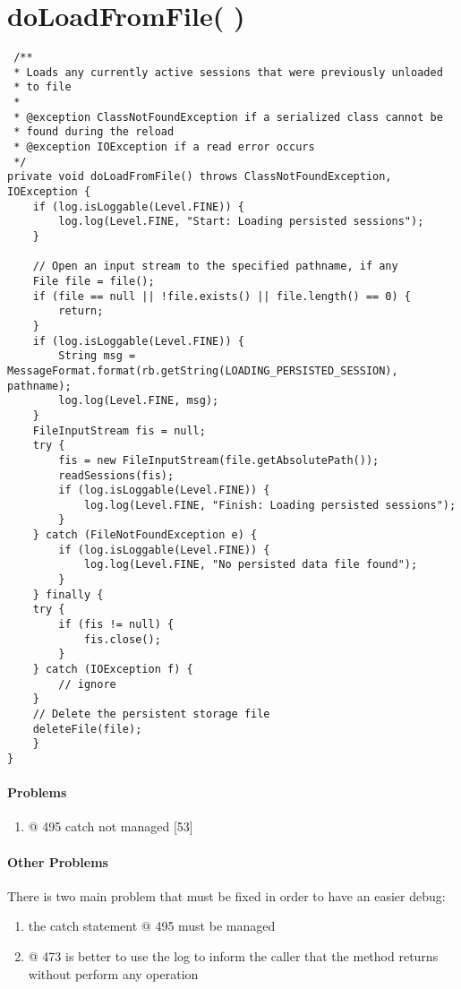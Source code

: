 
\section*{doLoadFromFile( )}

\lstset{firstnumber=457}
\begin{lstlisting}
 /**
 * Loads any currently active sessions that were previously unloaded
 * to file
 *
 * @exception ClassNotFoundException if a serialized class cannot be
 * found during the reload
 * @exception IOException if a read error occurs
 */
private void doLoadFromFile() throws ClassNotFoundException, IOException {
	if (log.isLoggable(Level.FINE)) {
		log.log(Level.FINE, "Start: Loading persisted sessions");
	}

	// Open an input stream to the specified pathname, if any
	File file = file();
	if (file == null || !file.exists() || file.length() == 0) {
		return;
	}
	if (log.isLoggable(Level.FINE)) {
		String msg = MessageFormat.format(rb.getString(LOADING_PERSISTED_SESSION), pathname);
		log.log(Level.FINE, msg);
	}
	FileInputStream fis = null;
	try {
		fis = new FileInputStream(file.getAbsolutePath());
		readSessions(fis);
		if (log.isLoggable(Level.FINE)) {
			log.log(Level.FINE, "Finish: Loading persisted sessions");
		}
	} catch (FileNotFoundException e) {
		if (log.isLoggable(Level.FINE)) {
			log.log(Level.FINE, "No persisted data file found");
		}
	} finally {
	try {
		if (fis != null) {
			fis.close();
		}
	} catch (IOException f) {
		// ignore
	}
	// Delete the persistent storage file
	deleteFile(file);
	}
}

\end{lstlisting}

\paragraph{Problems}
\begin{enumerate}
	\item @ 495 catch not managed [53]
\end{enumerate}

\paragraph{Other Problems}
There is two main problem that must be fixed in order to have an easier debug:

\begin{enumerate}
	\item the catch statement @ 495 must be managed
	\item @ 473 is better to use the log to inform the caller that the method returns without perform any operation
\end{enumerate}


